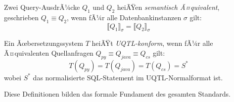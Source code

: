 \begin{definition}
\label{def:sem_aequiv}
Zwei Query-AusdrÃ¼cke $Q_1$ und $Q_2$ heiÃŸen \emph{semantisch Ã¤quivalent},
geschrieben $Q_1 \equiv Q_2$, wenn fÃ¼r alle Datenbankinstanzen $\sigma$ gilt:
\[
  \llbracket Q_1 \rrbracket_\sigma = \llbracket Q_2 \rrbracket_\sigma
\]
\end{definition}

\begin{definition}
\label{def:konformitaet}
Ein Ãœbersetzungssystem $T$ heiÃŸt \emph{UQTL-konform}, wenn fÃ¼r alle
Ã¤quivalenten Quellanfragen $Q_{py} \equiv Q_{java} \equiv Q_{cs}$ gilt:
\[
  T(Q_{py}) = T(Q_{java}) = T(Q_{cs}) = S^*
\]
wobei $S^*$ das normalisierte SQL-Statement im UQTL-Normalformat ist.
\end{definition}

Diese Definitionen bilden das formale Fundament des gesamten Standards.

